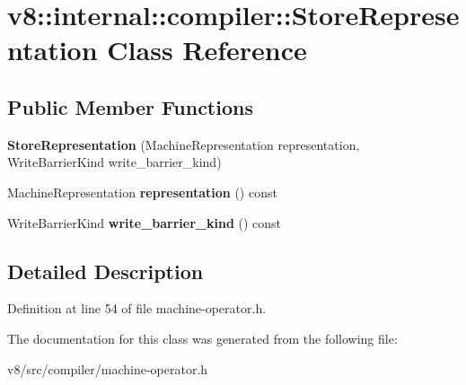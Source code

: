 \hypertarget{classv8_1_1internal_1_1compiler_1_1StoreRepresentation}{}\section{v8\+:\+:internal\+:\+:compiler\+:\+:Store\+Representation Class Reference}
\label{classv8_1_1internal_1_1compiler_1_1StoreRepresentation}
\subsection*{Public Member Functions}
\begin{DoxyCompactItemize}
\item 
\mbox{\label{classv8_1_1internal_1_1compiler_1_1StoreRepresentation_a434f7322ec291f7f4b1a8b945195a62b}} 
{\bfseries Store\+Representation} (Machine\+Representation representation, Write\+Barrier\+Kind write\+\_\+barrier\+\_\+kind)
\item 
\mbox{\label{classv8_1_1internal_1_1compiler_1_1StoreRepresentation_acbfeac7c99ccc8a26691e03b90c30cfa}} 
Machine\+Representation {\bfseries representation} () const
\item 
\mbox{\label{classv8_1_1internal_1_1compiler_1_1StoreRepresentation_ad21811649166ca52b9a8de881376fc96}} 
Write\+Barrier\+Kind {\bfseries write\+\_\+barrier\+\_\+kind} () const
\end{DoxyCompactItemize}


\subsection{Detailed Description}


Definition at line 54 of file machine-\/operator.\+h.



The documentation for this class was generated from the following file\+:\begin{DoxyCompactItemize}
\item 
v8/src/compiler/machine-\/operator.\+h\end{DoxyCompactItemize}
